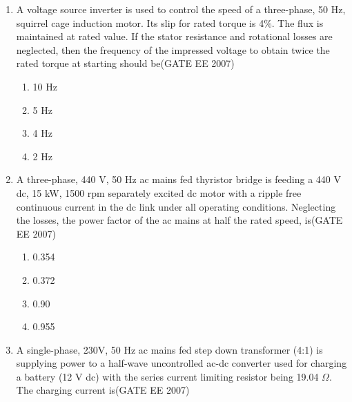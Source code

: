 \documentclass[a4paper,10pt]{exam}
\theoremstyle{remark}
\begin{document}
\begin{enumerate}
\begin{multicols}{4}
\begin{enumerate}
    \item  65.65\%
 \item  48.42\%
 \item 31.83\%
 \item  30.49\%
\end{enumerate}
\end{multicols}

\item  \quad A voltage source inverter is used to control the speed of a three-phase, 50 Hz, squirrel cage induction motor. Its slip for rated torque is 4\%. The flux is maintained at rated value. If the stator resistance and rotational losses are neglected, then the frequency of the impressed voltage to obtain twice the rated torque at starting should be\hfill{(GATE EE 2007)} 

\begin{multicols}{4}
\begin{enumerate}
 \item  10 Hz
 \item  5 Hz
 \item  4 Hz
 \item  2 Hz
 \end{enumerate}
\end{multicols}

\item \quad A three-phase, 440 V, 50 Hz ac mains fed thyristor bridge is feeding a 440 V dc, 15 kW, 1500 rpm separately excited dc motor with a ripple free continuous current in the dc link under all operating conditions. Neglecting the losses, the power factor of the ac mains at half the rated speed, is\hfill{(GATE EE 2007)} 

\begin{multicols}{4}
\begin{enumerate}
 \item  0.354
 \item 0.372
 \item 0.90
 \item 0.955
 \end{enumerate}
\end{multicols}

\item \quad A single-phase, 230V, 50 Hz ac mains fed step down transformer (4:1) is supplying power to a half-wave uncontrolled ac-dc converter used for charging a battery (12 V dc) with the series current limiting resistor being 19.04 $\Omega$. The charging current is\hfill{(GATE EE 2007)} 


\end{enumerate}
\end{document}
